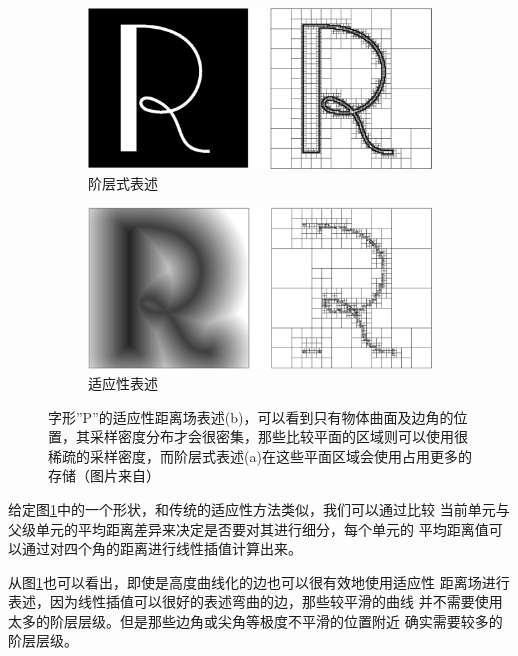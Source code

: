\begin{figure}
\begin{fullwidth}
	\begin{subfigure}[b]{0.5\thewidth}
		\includegraphics[width=\textwidth]{figures/df/adf-1}
		\caption{阶层式表述}
	\end{subfigure}
	\begin{subfigure}[b]{0.5\thewidth}
		\includegraphics[width=\textwidth]{figures/df/adf-2}
		\caption{适应性表述}
	\end{subfigure}
	\caption{字形”P”的适应性距离场表述(b)，可以看到只有物体曲面及边角的位置，其采样密度分布才会很密集，那些比较平面的区域则可以使用很稀疏的采样密度，而阶层式表述(a)在这些平面区域会使用占用更多的存储（图片来自\cite{a:adf}）}
	\label{f:df-adf}
\end{fullwidth}
\end{figure}

给定图\ref{f:df-adf}中的一个形状，和传统的适应性方法类似，我们可以通过比较 当前单元与父级单元的平均距离差异来决定是否要对其进行细分，每个单元的 平均距离值可以通过对四个角的距离进行线性插值计算出来。

从图\ref{f:df-adf}也可以看出，即使是高度曲线化的边也可以很有效地使用适应性 距离场进行表述，因为线性插值可以很好的表述弯曲的边，那些较平滑的曲线 并不需要使用太多的阶层层级。但是那些边角或尖角等极度不平滑的位置附近 确实需要较多的阶层层级。

